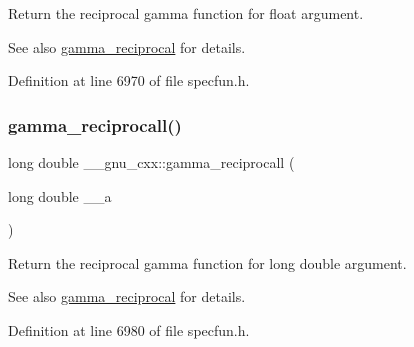 Return the reciprocal gamma function for {\ttfamily  float } argument.

\begin{DoxySeeAlso}{See also}
\hyperlink{group__gnu__math__spec__func_ga641f9bcdb8fc32a9a0ce7a15b5040076}{gamma\+\_\+reciprocal} for details. 
\end{DoxySeeAlso}


Definition at line 6970 of file specfun.\+h.

\mbox{\label{group__gnu__math__spec__func_ga73bfcace13daa8b50e7e7e3f583a2eb0}} 
\subsubsection{\texorpdfstring{gamma\+\_\+reciprocall()}{gamma\_reciprocall()}}
{\footnotesize\ttfamily long double \+\_\+\+\_\+gnu\+\_\+cxx\+::gamma\+\_\+reciprocall (\begin{DoxyParamCaption}\item[{long double}]{\+\_\+\+\_\+a }\end{DoxyParamCaption})\hspace{0.3cm}{\ttfamily [inline]}}

Return the reciprocal gamma function for {\ttfamily  long double } argument.

\begin{DoxySeeAlso}{See also}
\hyperlink{group__gnu__math__spec__func_ga641f9bcdb8fc32a9a0ce7a15b5040076}{gamma\+\_\+reciprocal} for details. 
\end{DoxySeeAlso}


Definition at line 6980 of file specfun.\+h.

\mbox{\label{group__gnu__math__spec__func_ga512e7981e328d6184f604de1892048b6}} 
